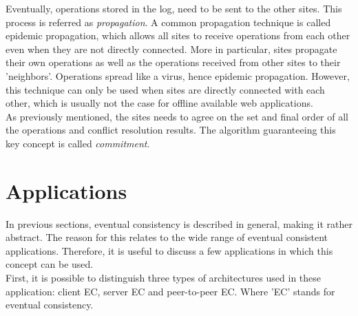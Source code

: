\documentclass[a4paper,12pt]{report}
\begin{document}
\indent Eventually, operations stored in the log, need to be sent to the other sites. This process is referred as \textit{propagation}. A common propagation technique is called epidemic propagation, which allows all sites to receive operations from each other even when they are not directly connected. More in particular, sites propagate their own operations as well as the operations received from other sites to their 'neighbors'. Operations spread like a virus, hence epidemic propagation. However, this technique can only be used when sites are directly connected with each other, which is usually not the case for offline available web applications. \\
\indent As previously mentioned, the sites needs to agree on the set and final order of all the operations and conflict resolution results. The algorithm guaranteeing this key concept is called \textit{commitment}. 

\section{Applications}\label{sec:Applications}

In previous sections, eventual consistency is described in general, making it rather abstract. The reason for this relates to the wide range of eventual consistent applications. Therefore, it is useful to discuss a few applications in which this concept can be used. \\
First, it is possible to distinguish three types of architectures used in these application: client EC, server EC and peer-to-peer EC. Where 'EC' stands for eventual consistency. 
\end{document}
